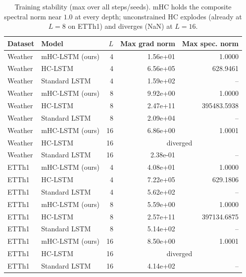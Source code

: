\begin{table}[t]
\centering
\caption{Training stability (max over all steps/seeds). mHC holds the composite spectral norm near $1.0$ at every depth; unconstrained HC explodes (already at $L{=}8$ on ETTh1) and diverges (NaN) at $L{=}16$.}
\label{tab:stability}
\footnotesize
\begin{tabular}{llrrr}
\toprule
Dataset & Model & $L$ & Max grad norm & Max spec. norm \\
\midrule
Weather & mHC-LSTM (ours) & 4 & 1.56e+01 & 1.0000 \\
Weather & HC-LSTM & 4 & 6.56e+05 & 628.9461 \\
Weather & Standard LSTM & 4 & 1.59e+02 & -- \\
Weather & mHC-LSTM (ours) & 8 & 9.92e+00 & 1.0000 \\
Weather & HC-LSTM & 8 & 2.47e+11 & 395483.5938 \\
Weather & Standard LSTM & 8 & 2.09e+04 & -- \\
Weather & mHC-LSTM (ours) & 16 & 6.86e+00 & 1.0001 \\
Weather & HC-LSTM & 16 & \multicolumn{2}{c}{diverged} \\
Weather & Standard LSTM & 16 & 2.38e-01 & -- \\
\midrule
ETTh1 & mHC-LSTM (ours) & 4 & 4.08e+01 & 1.0000 \\
ETTh1 & HC-LSTM & 4 & 7.22e+05 & 629.1806 \\
ETTh1 & Standard LSTM & 4 & 5.62e+02 & -- \\
ETTh1 & mHC-LSTM (ours) & 8 & 5.59e+00 & 1.0000 \\
ETTh1 & HC-LSTM & 8 & 2.57e+11 & 397134.6875 \\
ETTh1 & Standard LSTM & 8 & 5.14e+02 & -- \\
ETTh1 & mHC-LSTM (ours) & 16 & 8.50e+00 & 1.0001 \\
ETTh1 & HC-LSTM & 16 & \multicolumn{2}{c}{diverged} \\
ETTh1 & Standard LSTM & 16 & 4.14e+02 & -- \\
\bottomrule
\end{tabular}
\end{table}
